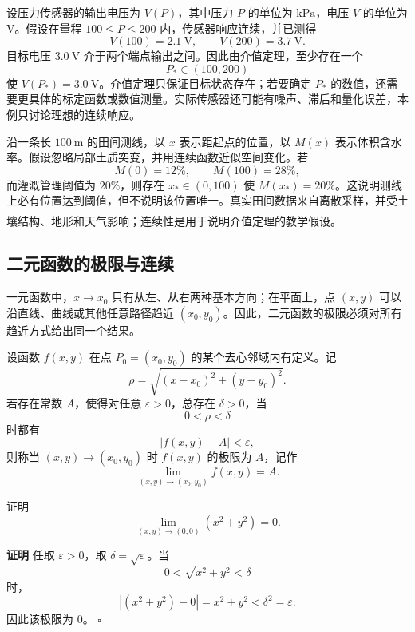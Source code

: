 \documentclass[fontset=fandol]{ctexart}
\newenvironment{proofdetail}{\par\noindent\textbf{证明}\quad}{\hfill$\square$\par\vspace{0.8em}}
\newcommand{\upcite}[1]{\textsuperscript{\textsuperscript{\cite{#1}}}}
\begin{document}
\begin{application}[工程：传感器标定与介值定理]
设压力传感器的输出电压为 $V(P)$，其中压力 $P$ 的单位为 $\mathrm{kPa}$，电压 $V$ 的单位为 $\mathrm V$。假设在量程 $100\leq P\leq200$ 内，传感器响应连续，并已测得
\[
V(100)=2.1\ \mathrm V,\qquad V(200)=3.7\ \mathrm V.
\]
目标电压 $3.0\ \mathrm V$ 介于两个端点输出之间。因此由介值定理，至少存在一个
\[
P_*\in(100,200)
\]
使 $V(P_*)=3.0\ \mathrm V$。介值定理只保证目标状态存在；若要确定 $P_*$ 的数值，还需要更具体的标定函数或数值测量。实际传感器还可能有噪声、滞后和量化误差，本例只讨论理想的连续响应。
\end{application}

\begin{application}[农业：田间含水率阈值]
沿一条长 $100\ \mathrm m$ 的田间测线，以 $x$ 表示距起点的位置，以 $M(x)$ 表示体积含水率。假设忽略局部土质突变，并用连续函数近似空间变化。若
\[
M(0)=12\%,\qquad M(100)=28\%,
\]
而灌溉管理阈值为 $20\%$，则存在 $x_*\in(0,100)$ 使 $M(x_*)=20\%$。这说明测线上必有位置达到阈值，但不说明该位置唯一。真实田间数据来自离散采样，并受土壤结构、地形和天气影响；连续性是用于说明介值定理的教学假设。\upcite{BradyWeil}
\end{application}


\subsection{二元函数的极限与连续}

一元函数中，\(x\to x_0\) 只有从左、从右两种基本方向；在平面上，点 \((x,y)\) 可以沿直线、曲线或其他任意路径趋近 \((x_0,y_0)\)。因此，二元函数的极限必须对所有趋近方式给出同一个结果。

\begin{definition}[二元函数的极限]
	设函数 \(f(x,y)\) 在点 \(P_0=(x_0,y_0)\) 的某个去心邻域内有定义。记
	\[
	\rho=\sqrt{(x-x_0)^2+(y-y_0)^2}.
	\]
	若存在常数 \(A\)，使得对任意 \(\varepsilon>0\)，总存在 \(\delta>0\)，当
	\[
	0<\rho<\delta
	\]
	时都有
	\[
	|f(x,y)-A|<\varepsilon,
	\]
	则称当 \((x,y)\to(x_0,y_0)\) 时 \(f(x,y)\) 的极限为 \(A\)，记作
	\[
	\lim_{(x,y)\to(x_0,y_0)}f(x,y)=A.
	\]
\end{definition}

\begin{example}[按定义证明二元极限]
	证明
	\[
	\lim_{(x,y)\to(0,0)}(x^2+y^2)=0.
	\]
\end{example}
\begin{proofdetail}
	任取 \(\varepsilon>0\)，取 \(\delta=\sqrt{\varepsilon}\)。当
	\[
	0<\sqrt{x^2+y^2}<\delta
	\]
	时，
	\[
	|(x^2+y^2)-0|=x^2+y^2<\delta^2=\varepsilon.
	\]
	因此该极限为 \(0\)。
\end{proofdetail}
\end{document}
